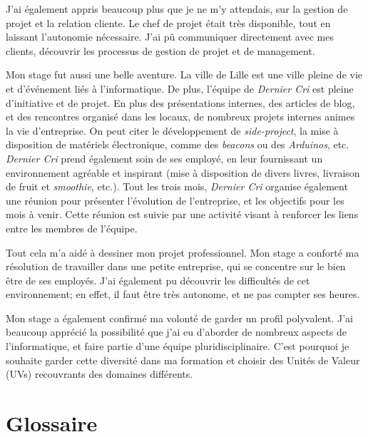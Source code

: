 \documentclass[12pt,a4paper]{article}
\begin{document}
  \bigskip

  J'ai également appris beaucoup plus que je ne m'y attendais, sur la
  gestion de projet et la relation cliente. Le chef de projet était très
  disponible, tout en laissant l'autonomie nécessaire. J'ai pû communiquer
  directement avec mes clients, découvrir les processus de gestion de
  projet et de management.

  \bigskip

  Mon stage fut aussi une belle aventure. La ville de Lille est une ville
  pleine de vie et d'événement liés à l'informatique. De plus, l'équipe de
  \emph{Dernier Cri} est pleine d'initiative et de projet. En plus des
  présentations internes, des articles de blog, et des rencontres organisé
  dans les locaux, de nombreux projets internes animes la vie
  d'entreprise. On peut citer le développement de \emph{side-project}, la
  mise à disposition de matériels électronique, comme des \emph{beacons}
  ou des \emph{Arduinos}, etc.\\
  \emph{Dernier Cri} prend également soin de ses employé, en leur
  fournissant un environnement agréable et inspirant (mise à disposition
  de divers livres, livraison de fruit et \emph{smoothie}, etc.). Tout les
  trois mois, \emph{Dernier Cri} organise également une réunion pour
  présenter l'évolution de l'entreprise, et les objectifs pour les mois à
  venir. Cette réunion est suivie par une activité visant à renforcer les
  liens entre les membres de l'équipe.

  \bigskip

  Tout cela m'a aidé à dessiner mon projet professionnel. Mon stage a
  conforté ma résolution de travailler dans une petite entreprise, qui se
  concentre sur le bien être de ses employés. J'ai également pu découvrir
  les difficultés de cet environnement; en effet, il faut être très
  autonome, et ne pas compter ses heures.

  \bigskip

  Mon stage a également confirmé ma volonté de garder un profil
  polyvalent. J'ai beaucoup apprécié la possibilité que j'ai eu d'aborder
  de nombreux aspects de l'informatique, et faire partie d'une équipe
  pluridisciplinaire. C'est pourquoi je souhaite garder cette diversité
  dans ma formation et choisir des Unités de Valeur (UVs) recouvrants des
  domaines différents.

  \newpage

  \section{Glossaire}\label{glossaire}
\end{document}
